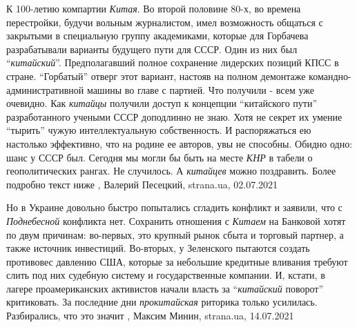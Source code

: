 К 100-летию компартии \emph{Китая}.  Во второй половине 80-х, во времена перестройки,
будучи вольным журналистом, имел возможность общаться с закрытыми в специальную
группу академиками, которые для Горбачева разрабатывали варианты будущего пути
для СССР. Один из них был \enquote{\emph{китайский}}. Предполагавший полное сохранение
лидерских позиций КПСС в стране.  \enquote{Горбатый} отверг этот вариант, настояв на
полном демонтаже командно-административной машины во главе с партией. Что
получили - всем уже очевидно.  Как \emph{китайцы} получили доступ к концепции
\enquote{китайского пути} разработанного учеными СССР доподлинно не знаю. Хотя не
секрет их умение \enquote{тырить} чужую интеллектуальную собственность. И распоряжаться
ею настолько эффективно, что на родине ее авторов, увы не способны. Обидно
одно: шанс у СССР был. Сегодня мы могли бы быть на месте \emph{КНР} в табели о
геополитических рангах.  Не случилось. А \emph{китайцев} можно поздравить. Более
подробно текст ниже
, 
Валерий Песецкий, strana.ua, 02.07.2021

Но в Украине довольно быстро попытались сгладить конфликт и заявили, что с
\emph{Поднебесной} конфликта нет.  Сохранить отношения с \emph{Китаем} на
Банковой хотят по двум причинам: во-первых, это крупный рынок сбыта и торговый
партнер, а также источник инвестиций.  Во-вторых, у Зеленского пытаются создать
противовес давлению США, которые за небольшие кредитные вливания требуют слить
под них судебную систему и государственные компании. И, кстати, в лагере
проамериканских активистов начали власть за \enquote{\emph{китайский} поворот}
критиковать.  За последние дни \emph{прокитайская} риторика только усилилась.
Разбирались, что это значит
, 
Максим Минин, strana.ua, 14.07.2021


